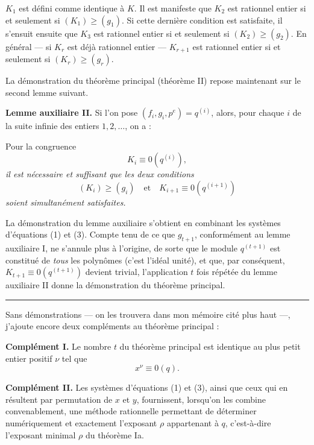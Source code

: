 $K_1$ est défini comme identique à $K$. Il est manifeste que $K_2$ est rationnel entier si et seulement si $(K_1)\geq(g_1)$. Si cette dernière condition est satisfaite, il s'ensuit ensuite que $K_3$ est rationnel entier si et seulement si $(K_2)\geq(g_2)$. En général --- si $K_r$ est déjà rationnel entier --- $K_{r+1}$ est rationnel entier si et seulement si $(K_r)\geq(g_r)$.

La démonstration du théorème principal (théorème II) repose maintenant sur le second lemme suivant.

\textbf{Lemme auxiliaire II.} Si l'on pose $(f_i,g_i,p^e)=q^{(i)}$, alors, pour chaque $i$ de la suite infinie des entiers $1,2,\ldots$, on a :

Pour la congruence
\[
K_i\equiv0(q^{(i)}),
\]
\emph{il est nécessaire et suffisant que les deux conditions}
\[
(K_i)\geq(g_i)\quad\text{et}\quad K_{i+1}\equiv0(q^{(i+1)})
\]
\emph{soient simultanément satisfaites.}

La démonstration du lemme auxiliaire s'obtient en combinant les systèmes d'équations (1) et (3). Compte tenu de ce que $g_{t+1}$, conformément au lemme auxiliaire I, ne s'annule plus à l'origine, de sorte que le module $q^{(t+1)}$ est constitué de \emph{tous} les polynômes (c'est l'idéal unité), et que, par conséquent, $K_{t+1}\equiv0(q^{(t+1)})$ devient trivial, l'application $t$ fois répétée du lemme auxiliaire II donne la démonstration du théorème principal.

\begin{center}
\rule{4cm}{0.4pt}
\end{center}

Sans démonstrations --- on les trouvera dans mon mémoire cité plus haut ---, j'ajoute encore deux compléments au théorème principal :

\textbf{Complément I.} Le nombre $t$ du théorème principal est identique au plus petit entier positif $\nu$ tel que
\[
x^\nu\equiv0(q).
\]

\textbf{Complément II.} Les systèmes d'équations (1) et (3), ainsi que ceux qui en résultent par permutation de $x$ et $y$, fournissent, lorsqu'on les combine convenablement, une méthode rationnelle permettant de déterminer numériquement et exactement l'exposant $\rho$ \og appartenant\fg{} à $q$, c'est-à-dire l'exposant minimal $\rho$ du théorème Ia.

